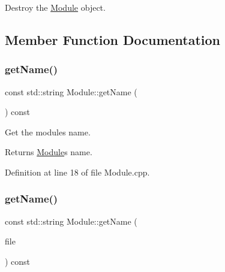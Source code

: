 Destroy the \hyperlink{class_zia_1_1_module}{Module} object. 



\subsection{Member Function Documentation}
\mbox{\label{class_zia_1_1_module_ac0eaf9796e9cb65c279743f3c6377b1b}} 
\subsubsection{\texorpdfstring{get\+Name()}{getName()}\hspace{0.1cm}{\footnotesize\ttfamily [1/2]}}
{\footnotesize\ttfamily const std\+::string Module\+::get\+Name (\begin{DoxyParamCaption}\item[{void}]{ }\end{DoxyParamCaption}) const\hspace{0.3cm}{\ttfamily [noexcept]}}



Get the module\textquotesingle{}s name. 

\begin{DoxyReturn}{Returns}
\hyperlink{class_zia_1_1_module}{Module}\textquotesingle{}s name. 
\end{DoxyReturn}


Definition at line 18 of file Module.\+cpp.

\mbox{\label{class_zia_1_1_module_a93f4a37a5e91739c2584292e540d6dff}} 
\subsubsection{\texorpdfstring{get\+Name()}{getName()}\hspace{0.1cm}{\footnotesize\ttfamily [2/2]}}
{\footnotesize\ttfamily const std\+::string Module\+::get\+Name (\begin{DoxyParamCaption}\item[{const \hyperlink{namespacecfg_af0aed6e47bd26e91ad7d69467f96caaf}{cfg\+::\+File\+Descriptor} \&}]{file }\end{DoxyParamCaption}) const}




